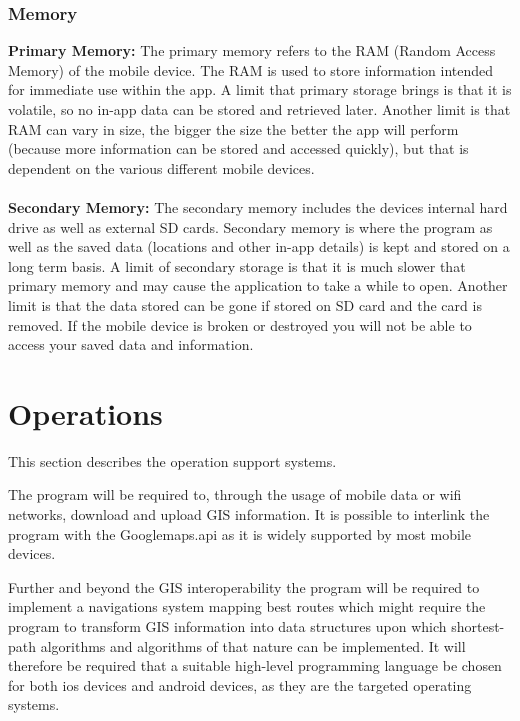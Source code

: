 \documentclass[11pt]{article}
\begin{document}
\subsubsection{Memory}
\textbf{Primary Memory:}
The primary memory refers to the RAM (Random Access Memory) of the mobile device. 
The RAM is used to store information intended for immediate use within the app. 
A limit that primary storage brings is that it is volatile, so no in-app data can be stored and retrieved later.
Another limit is that RAM can vary in size, the bigger the size the better the app will perform (because more information can be stored and accessed quickly), but that is dependent on the various different mobile devices.\\\\
\textbf{Secondary Memory:}
The secondary memory includes the devices internal hard drive as well as external SD cards.
Secondary memory is where the program as well as the saved data (locations and other in-app details) is kept and stored on a long term basis. 
A limit of secondary storage is that it is much slower that primary memory and may cause the application to take a while to open.
Another limit is that the data stored can be gone if stored on SD card and the card is removed.
If the mobile device is broken or destroyed you will not be able to access your saved data and information.


\section{Operations}



This section describes the operation support systems.

		

The program will be required to, through the usage of mobile data or wifi networks, download and upload GIS information. It is possible to interlink the program with the Googlemaps.api as it is widely supported by most mobile devices.

		

Further and beyond the GIS interoperability the program will be required to implement a navigations system mapping best routes which might require the program to transform GIS information into data structures upon which shortest-path algorithms and algorithms of that nature can be implemented. It will therefore be required that a suitable high-level programming language be chosen for both ios devices and android devices, as they are the targeted operating systems.
\end{document}

